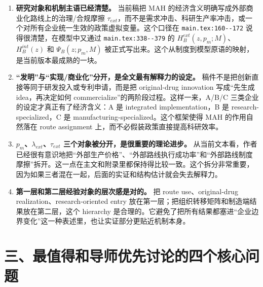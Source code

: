 \documentclass[12pt]{ctexart}
\newcommand{\fileref}[1]{\nolinkurl{#1}}
\begin{document}
\begin{enumerate}
\item \textbf{研究对象和机制主语已经清楚。}
当前稿把 MAH 的经济含义明确写成外部商业化路线上的治理/合规摩擦 $\tau_{ext}$，而不是需求冲击、科研生产率冲击，或一个对所有企业统一生效的政策虚拟变量。这个口径在 \fileref{main.tex:160--172} 说得很清楚，在模型中又通过
\fileref{main.tex:338--379} 的 $H_B^{ext}(z,p_m;M)$、$H_B^{int}(z)$ 和 $\Psi_B(z;p_m,M)$ 被正式写出来。这个从制度到模型原语的映射，是当前版本最成熟的一块。

\item \textbf{“发明”与“实现/商业化”分开，是全文最有解释力的设定。}
稿件不是把创新直接等同于研发投入或专利申请，而是把 original-drug innovation 写成“先生成 idea，再决定如何 commercialize”的两阶段过程。这样一来，A/B/C 三类企业的设定才真正有了经济含义：A 是 integrated implementation，B 是 research-specialized，C 是 manufacturing-specialized。这个框架使得 MAH 的作用自然落在 route assignment 上，而不必假装政策直接提高科研效率。

\item \textbf{$p_m$、$\lambda_{ext}$、$\tau_{ext}$ 三个对象被分开，是很重要的理论进步。}
从当前文本看，作者已经很有意识地把“外部生产价格”、“外部路线执行成功率”和“外部路线制度摩擦”拆开。这一点在主文和附录里都保持得比较一致。这个拆分非常重要，因为如果三者混在一起，后面的实证和结构估计就会失去解释力。

\item \textbf{第一层和第二层经验对象的层次感是对的。}
把 route use、original-drug realization、research-oriented entry 放在第一层；把组织转移矩阵和制造端结果放在第二层，这个 hierarchy 是合理的。它避免了把所有结果都塞进“企业边界变化”这一种表述里，也让实证部分更贴近机制本身。
\end{enumerate}

\section*{三、最值得和导师优先讨论的四个核心问题}
\end{document}
